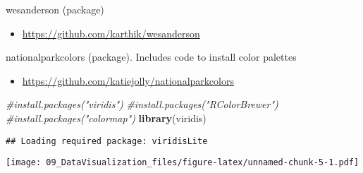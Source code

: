 \documentclass[]{article}
\newenvironment{Shaded}{\begin{snugshade}}{\end{snugshade}}
\newcommand{\KeywordTok}[1]{\textcolor[rgb]{0.13,0.29,0.53}{\textbf{#1}}}
\newcommand{\DataTypeTok}[1]{\textcolor[rgb]{0.13,0.29,0.53}{#1}}
\newcommand{\DecValTok}[1]{\textcolor[rgb]{0.00,0.00,0.81}{#1}}
\newcommand{\CommentTok}[1]{\textcolor[rgb]{0.56,0.35,0.01}{\textit{#1}}}
\newcommand{\OperatorTok}[1]{\textcolor[rgb]{0.81,0.36,0.00}{\textbf{#1}}}
\newcommand{\NormalTok}[1]{#1}
\providecommand{\tightlist}{%
  \setlength{\itemsep}{0pt}\setlength{\parskip}{0pt}}
\begin{document}
wesanderson (package)

\begin{itemize}
\tightlist
\item
  \url{https://github.com/karthik/wesanderson}
\end{itemize}

nationalparkcolors (package). Includes code to install color palettes

\begin{itemize}
\tightlist
\item
  \url{https://github.com/katiejolly/nationalparkcolors}
\end{itemize}

\begin{Shaded}
\begin{Highlighting}[]
\CommentTok{#install.packages("viridis")}
\CommentTok{#install.packages("RColorBrewer")}
\CommentTok{#install.packages("colormap")}
\KeywordTok{library}\NormalTok{(viridis)}
\end{Highlighting}
\end{Shaded}

\begin{verbatim}
## Loading required package: viridisLite
\end{verbatim}

\begin{Shaded}
\end{Shaded}

\texttt{[image: 09\_DataVisualization\_files/figure-latex/unnamed-chunk-5-1.pdf]}

\begin{Shaded}
\end{Shaded}
\end{document}
